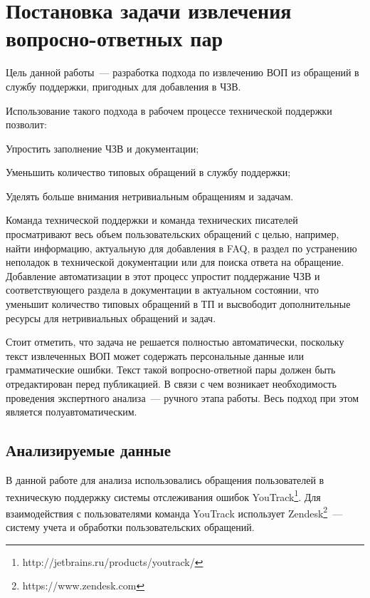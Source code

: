 \chapter{Постановка задачи извлечения вопросно-ответных пар}
\label{chap:task}

Цель данной работы~--- разработка подхода по извлечению ВОП из обращений в службу поддержки, пригодных для добавления в ЧЗВ. 

Использование такого подхода в рабочем процессе технической поддержки позволит:

\begin{enumerate*}
\item Упростить заполнение ЧЗВ и документации;
\item Уменьшить количество типовых обращений в службу поддержки;
\item Уделять больше внимания нетривиальным обращениям и задачам.
\end{enumerate*}

Команда технической поддержки и команда технических писателей просматривают весь объем пользовательских обращений с целью, например, найти информацию, актуальную для добавления в FAQ, в раздел по устранению неполадок в технической документации или для поиска ответа на обращение. Добавление автоматизации в этот процесс упростит поддержание ЧЗВ и соответствующего раздела в документации в актуальном состоянии, что уменьшит количество типовых обращений в ТП и высвободит дополнительные ресурсы для нетривиальных обращений и задач. 

Стоит отметить, что задача не решается полностью автоматически, поскольку текст извлеченных ВОП может содержать персональные данные или грамматические ошибки. Текст такой вопросно-ответной пары должен быть отредактирован перед публикацией. В связи с чем возникает необходимость проведения экспертного анализа~--- ручного этапа работы. Весь подход при этом является полуавтоматическим.

\section{Анализируемые данные}
\label{sec:data}
В данной работе для анализа использовались обращения пользователей в техническую поддержку системы отслеживания ошибок YouTrack\footnote{http://jetbrains.ru/products/youtrack/}. Для взаимодействия с пользователями команда YouTrack использует Zendesk\footnote{https://www.zendesk.com}~--- систему учета и обработки пользовательских обращений.

